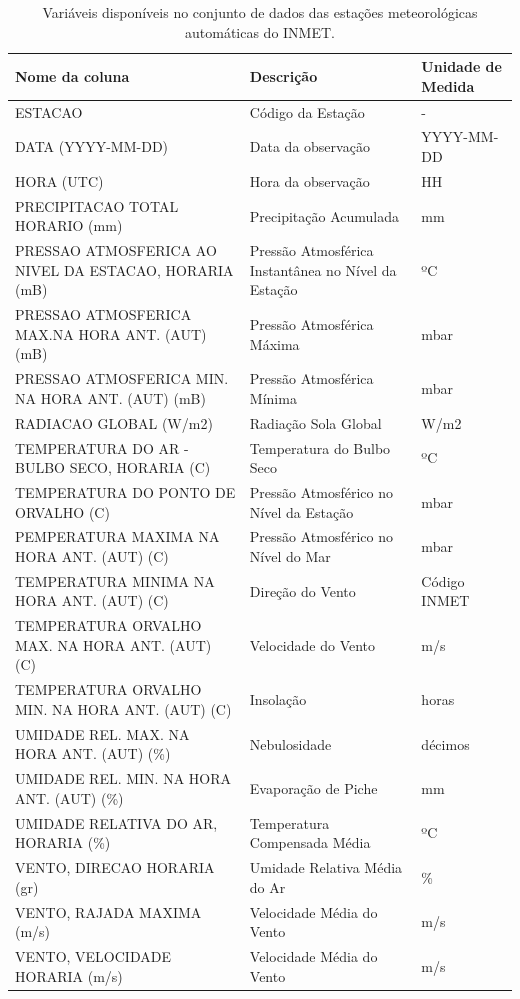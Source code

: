 \begin{table}[h!]
\caption{Variáveis disponíveis no conjunto de dados das estações meteorológicas automáticas do INMET.}
\label{tab:variaveis_estacoes_automaticas}
\begin{adjustbox}{width=\textwidth}
\begin{tabular}{|l|l|l|}
\hline
\textbf{Nome da coluna} & \textbf{Descrição} & \textbf{Unidade de Medida}\\
\hline
ESTACAO & Código da Estação  & -\\
\hline
DATA (YYYY-MM-DD) & Data da observação  & YYYY-MM-DD\\
\hline
HORA (UTC) & Hora da observação  & HH\\
\hline
PRECIPITACAO TOTAL HORARIO (mm) & Precipitação Acumulada  & mm\\
\hline
PRESSAO ATMOSFERICA AO NIVEL DA ESTACAO, HORARIA (mB)  & Pressão Atmosférica Instantânea no Nível da Estação & ºC\\
\hline
PRESSAO ATMOSFERICA MAX.NA HORA ANT. (AUT) (mB) & Pressão Atmosférica Máxima & mbar\\
\hline
PRESSAO ATMOSFERICA MIN. NA HORA ANT. (AUT) (mB)  & Pressão Atmosférica Mínima & mbar\\
\hline
RADIACAO GLOBAL (W/m2)  & Radiação Sola Global & W/m2\\
\hline
TEMPERATURA DO AR - BULBO SECO, HORARIA (C)  & Temperatura do Bulbo Seco & ºC \\
\hline
TEMPERATURA DO PONTO DE ORVALHO (C)  & Pressão Atmosférico no Nível da Estação & mbar \\
\hline
PEMPERATURA MAXIMA NA HORA ANT. (AUT) (C)  & Pressão Atmosférico no Nível do Mar & mbar \\
\hline
TEMPERATURA MINIMA NA HORA ANT. (AUT) (C)  & Direção do Vento & Código INMET\\
\hline
TEMPERATURA ORVALHO MAX. NA HORA ANT. (AUT) (C)  & Velocidade do Vento & m/s\\
\hline
TEMPERATURA ORVALHO MIN. NA HORA ANT. (AUT) (C)  & Insolação & horas\\
\hline
UMIDADE REL. MAX. NA HORA ANT. (AUT) (\%) & Nebulosidade & décimos \\
\hline
UMIDADE REL. MIN. NA HORA ANT. (AUT) (\%) & Evaporação de Piche & mm\\
\hline
UMIDADE RELATIVA DO AR, HORARIA (\%) & Temperatura Compensada Média & ºC\\
\hline
VENTO, DIRECAO HORARIA (gr) & Umidade Relativa Média do Ar & \% \\
\hline
VENTO, RAJADA MAXIMA (m/s) & Velocidade Média do Vento & m/s\\
\hline
VENTO, VELOCIDADE HORARIA (m/s) & Velocidade Média do Vento & m/s\\
\hline
\end{tabular}
\end{adjustbox}
\end{table}

